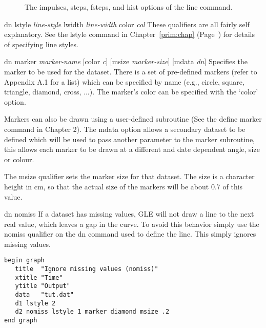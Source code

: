 \begin{commanddescription}
\begin{figure}[tb]
\centering

\caption{\label{linemode:fig}The {\sf impulses}, {\sf steps}, {\sf fsteps}, and {\sf hist} options of the line command.}
\end{figure}

\item[{\sf dn lstyle {\it line-style} lwidth {\it line-width} color {\it col}}  ]
These qualifiers are all fairly self explanatory.  See the {\sf lstyle} command
in Chapter~\ref{prim:chap} (Page~\pageref{lstyle:cmd}) for details of specifying line styles.

\item[{\sf dn marker {\it marker-name} [color {\it c}] [msize {\it marker-size}] [mdata {\it dn}]}]
Specifies the marker to be used for the dataset.  There is a set of pre-defined markers (refer to Appendix A.1 for a list)  which can be specified by name (e.g., {\sf circle, square, triangle, diamond, cross, ...}). The marker's color can be specified with the `{\sf color}' option.

Markers can also be drawn using a user-defined subroutine (See the {\sf define marker} command in Chapter 2).  The {\sf mdata} option allows a secondary dataset to be defined which will be used to pass another parameter to the marker subroutine, this allows each marker to be drawn at a different and date dependent angle, size or colour.

The {\sf msize} qualifier sets the marker size for that dataset. The size is a character height in cm, so that the actual size of the markers will be about 0.7 of this value.

\item[{\sf dn nomiss}  ]
If a dataset has missing values, GLE will not draw a line to the next
real value, which leaves a gap in the curve.  To avoid this
behavior simply use the {\sf nomiss} qualifier on the {\sf dn} command
used to define the line. This simply ignores missing values.

\begin{minipage}[c]{8cm}
\begin{Verbatim}
begin graph
   title  "Ignore missing values (nomiss)"
   xtitle "Time"
   ytitle "Output"
   data   "tut.dat"
   d1 lstyle 2
   d2 nomiss lstyle 1 marker diamond msize .2
end graph
\end{Verbatim}
\end{minipage}
\hfill
\begin{minipage}[c]{7cm}
\mbox{}
\end{minipage}


\end{commanddescription}
